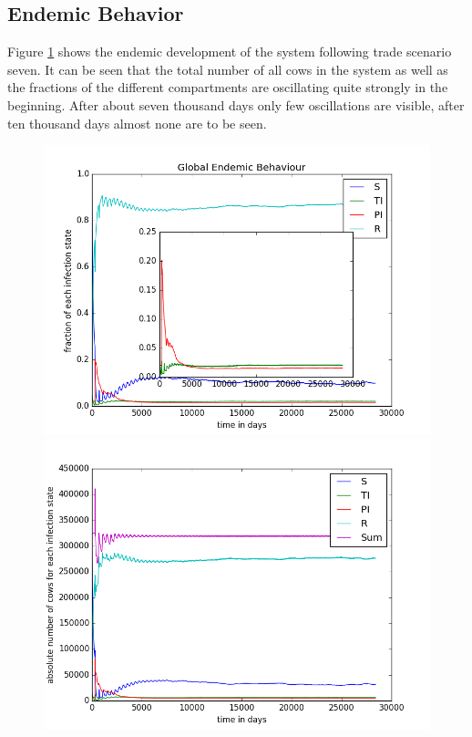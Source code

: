 \subsection{Endemic Behavior}
Figure \ref{fig:endemicTransients} shows the endemic development of the system following trade scenario seven. It can be seen that the total number of all cows in the system as well as the fractions of the different compartments are oscillating quite strongly in the beginning. After about seven thousand days only few oscillations are visible, after ten thousand days almost none are to be seen.
\begin{figure}[htbp]
\begin{minipage}{0.5\textwidth}
\centering
\noindent\includegraphics[width=0.9\linewidth,height=\textheight,
keepaspectratio]{scen7endemicFractions.png} 
\end{minipage}
\begin{minipage}{0.5\textwidth}
\centering
\noindent\includegraphics[width=0.9\linewidth,height=\textheight,
keepaspectratio]{scen7totalEndemicNumbers.png} 
\end{minipage}
\caption[Endemic Transients]{}
\label{fig:endemicTransients}
\end{figure} 


